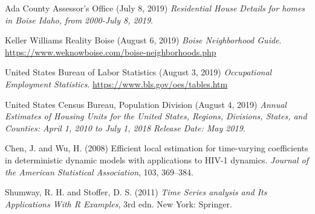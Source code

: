 \documentclass{article}
\begin{document}
\begin{thebibliography}{3}

Ada County Assessor's Office (July 8, 2019)
\newblock \textit{Residential House Details for homes in Boise Idaho, from 2000-July 8, 2019}.


Keller Williams Reality Boise (August 6, 2019)
\newblock \textit{Boise Neighborhood Guide}.
\newblock \url{https://www.weknowboise.com/boise-neighborhoods.php}


United States Bureau of Labor Statistics (August 3, 2019)
\newblock \textit{Occupational Employment Statistics}.
\newblock \url{https://www.bls.gov/oes/tables.htm}

United States Census Bureau, Population Division (August 4, 2019)
\newblock \textit{Annual Estimates of Housing Units for the United States, Regions, Divisions, States, and Counties: April 1, 2010 to July 1, 2018 Release Date: May 2019}.





Chen, J. and Wu, H. (2008)
\newblock Efficient local estimation for time-varying coefficients in
deterministic dynamic models with applications to {HIV}-1 dynamics.
\newblock \textit{Journal of the American Statistical Association}, 103, 369--384.

Shumway, R. H. and Stoffer, D. S. (2011)
\newblock \textit{Time Series analysis and Its Applications With R Examples}, 3rd edn.
\newblock New York: Springer.
\end{thebibliography}
\end{document}
